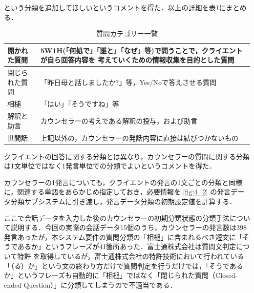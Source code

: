 \documentclass[shuuron]{kuee}
\begin{document}
という分類を追加してほしいというコメントを得た．以上の詳細を表\ref{table:queCate}にまとめる．
\begin{table}
  \caption{質問カテゴリー一覧}
  \label{table:queCate}
  \begin{center}
    \begin{tabular}{|l|p{7cm}|} \hline
      開かれた質問 & 5W1H(「何処で」「誰と」「なぜ」等)で問うことで，クライエントが自ら回答内容を
      考えていくための情報収集を目的とした質問
      \\ \hline
      閉じられた質問  & 「昨日母と話しましたか?」等，Yes/Noで答えさせる質問
      \\ \hline
      相槌 & 「はい」「そうですね」等
      \\ \hline
      解釈と助言  &  カウンセラーの考えである解釈の投与，および助言\\ \hline
      世間話 & 上記以外の，カウンセラーの発話内容に直接は結びつかないもの \\ \hline
    \end{tabular}
  \end{center}
\end{table}


クライエントの回答に関する分類とは異なり，カウンセラーの質問に関する分類は1文単位ではなく1発言単位での分類でよいというコメントを得た．


カウンセラーの1発言についても，クライエントの発言の1文ごとの分類と同様に，関連する単語をあらかじめ指定しておき，必要情報を
\ref{fig:4_2}
の発言データ分類サブシステムに引き渡し，発言データ分類の初期設定値を計算する．

ここで会話データを入力した後のカウンセラーの初期分類状態の分類手法について説明する．今回の実際の会話データ15個のうち，カウンセラーの発言数は398発言あったが，本システム要件の質問分類の「相槌」に含まれるべき短文に「そうであるか」というフレーズが41箇所あった．富士通株式会社は質問文判定について特許
\cite{tokkyo}
を取得しているが，富士通株式会社の特許技術において行われている「（る）か」という文の終わり方だけで質問判定を行うだけでは，「そうであるか」というフレーズも自動的に「相槌」ではなく「閉じられた質問（Closed-ended Question）」に分類してしまうので不適当である．
\end{document}
